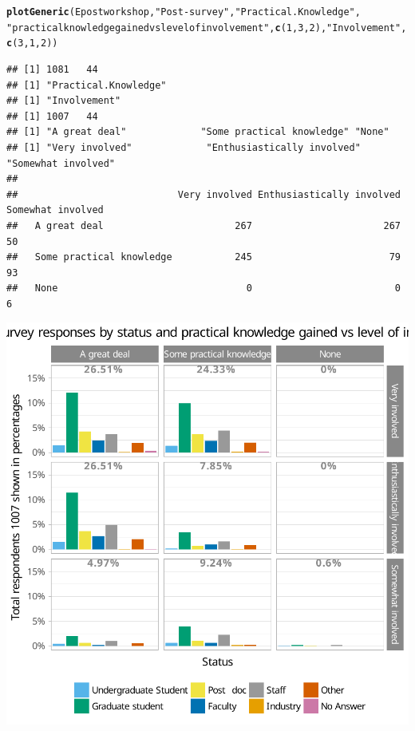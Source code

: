 \documentclass{article}\usepackage[]{graphicx}\usepackage[]{color}
\makeatletter
\newcommand{\hlnum}[1]{\textcolor[rgb]{0.686,0.059,0.569}{#1}}%
\newcommand{\hlstr}[1]{\textcolor[rgb]{0.192,0.494,0.8}{#1}}%
\newcommand{\hlstd}[1]{\textcolor[rgb]{0.345,0.345,0.345}{#1}}%
\newcommand{\hlkwd}[1]{\textcolor[rgb]{0.737,0.353,0.396}{\textbf{#1}}}%
\newenvironment{kframe}{%
 \def\at@end@of@kframe{}%
 \ifinner\ifhmode%
  \def\at@end@of@kframe{\end{minipage}}%
  \begin{minipage}{\columnwidth}%
 \fi\fi%
 \def\FrameCommand##1{\hskip\@totalleftmargin \hskip-\fboxsep
 \colorbox{shadecolor}{##1}\hskip-\fboxsep
     \hskip-\linewidth \hskip-\@totalleftmargin \hskip\columnwidth}%
 \MakeFramed {\advance\hsize-\width
   \@totalleftmargin\z@ \linewidth\hsize
   \@setminipage}}%
 {\par\unskip\endMakeFramed%
 \at@end@of@kframe}
\newenvironment{knitrout}{}{} %
\makeatother
\begin{document}
\begin{knitrout}
{}


\begin{kframe}\begin{alltt}
\hlkwd{plotGeneric}\hlstd{(Epostworkshop,} \hlstr{"Post-survey"}\hlstd{,} \hlstr{"Practical.Knowledge"} \hlstd{,}
            \hlstr{"practical knowledge gained vs level of involvement"}\hlstd{,} \hlkwd{c}\hlstd{(}\hlnum{1}\hlstd{,} \hlnum{3}\hlstd{,} \hlnum{2}\hlstd{),}\hlstr{"Involvement"}\hlstd{,} \hlkwd{c}\hlstd{(}\hlnum{3}\hlstd{,}\hlnum{1}\hlstd{,}\hlnum{2}\hlstd{))}
\end{alltt}
\begin{verbatim}
## [1] 1081   44
## [1] "Practical.Knowledge"
## [1] "Involvement"
## [1] 1007   44
## [1] "A great deal"             "Some practical knowledge" "None"                    
## [1] "Very involved"             "Enthusiastically involved" "Somewhat involved"        
##                           
##                            Very involved Enthusiastically involved Somewhat involved
##   A great deal                       267                       267                50
##   Some practical knowledge           245                        79                93
##   None                                 0                         0                 6
\end{verbatim}
\end{kframe}

{\centering \includegraphics[width=.6\linewidth]{figure/calls-Rnwplotting-postsurvey-data-4} 

}



\end{knitrout}
\end{document}

